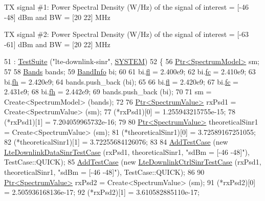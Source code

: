 TX signal \#1\+: Power Spectral Density (W/\+Hz) of the signal of interest = \mbox{[}-\/46 -\/48\mbox{]} d\+Bm and BW = \mbox{[}20 22\mbox{]} M\+Hz

TX signal \#2\+: Power Spectral Density (W/\+Hz) of the signal of interest = \mbox{[}-\/63 -\/61\mbox{]} d\+Bm and BW = \mbox{[}20 22\mbox{]} M\+Hz
\begin{DoxyCode}
51   : \hyperlink{classns3_1_1TestSuite_a904b0c40583b744d30908aeb94636d1a}{TestSuite} (\textcolor{stringliteral}{"lte-downlink-sinr"}, \hyperlink{classns3_1_1TestSuite_a1ebfcab34ec8161e085e8e3a1855eae0a90c5529a26ab3a5ffcc6e57040dbd82e}{SYSTEM})
52 \{
56   \hyperlink{classns3_1_1Ptr}{Ptr<SpectrumModel>} sm;
57 
58   \hyperlink{namespacens3_a46ac9188e5cf43bd5292f7b67451246e}{Bands} bands;
59   \hyperlink{structns3_1_1BandInfo}{BandInfo} bi;
60 
61   bi.\hyperlink{structns3_1_1BandInfo_a5e9018ae65c7625cc6d5c3c0067a9104}{fl} = 2.400e9;
62   bi.\hyperlink{structns3_1_1BandInfo_a02fad8a855735ff477f736bb8cb7bc25}{fc} = 2.410e9;
63   bi.\hyperlink{structns3_1_1BandInfo_a78e8fadd8cafcc28d74bda6010e3d6f4}{fh} = 2.420e9;
64   bands.push\_back (bi);
65 
66   bi.\hyperlink{structns3_1_1BandInfo_a5e9018ae65c7625cc6d5c3c0067a9104}{fl} = 2.420e9;
67   bi.\hyperlink{structns3_1_1BandInfo_a02fad8a855735ff477f736bb8cb7bc25}{fc} = 2.431e9;
68   bi.\hyperlink{structns3_1_1BandInfo_a78e8fadd8cafcc28d74bda6010e3d6f4}{fh} = 2.442e9;
69   bands.push\_back (bi);
70 
71   sm = Create<SpectrumModel> (bands);
72 
76   \hyperlink{classns3_1_1Ptr}{Ptr<SpectrumValue>} rxPsd1 = Create<SpectrumValue> (sm);
77   (*rxPsd1)[0] = 1.255943215755e-15;
78   (*rxPsd1)[1] = 7.204059965732e-16;
79 
80   \hyperlink{classns3_1_1Ptr}{Ptr<SpectrumValue>} theoreticalSinr1 = Create<SpectrumValue> (sm);
81   (*theoreticalSinr1)[0] = 3.72589167251055;
82   (*theoreticalSinr1)[1] = 3.72255684126076;
83 
84   \hyperlink{classns3_1_1TestCase_a3718088e3eefd5d6454569d2e0ddd835}{AddTestCase} (\textcolor{keyword}{new} \hyperlink{classLteDownlinkDataSinrTestCase}{LteDownlinkDataSinrTestCase} (rxPsd1, 
      theoreticalSinr1, \textcolor{stringliteral}{"sdBm = [-46 -48]"}), TestCase::QUICK);
85   \hyperlink{classns3_1_1TestCase_a3718088e3eefd5d6454569d2e0ddd835}{AddTestCase} (\textcolor{keyword}{new} \hyperlink{classLteDownlinkCtrlSinrTestCase}{LteDownlinkCtrlSinrTestCase} (rxPsd1, 
      theoreticalSinr1, \textcolor{stringliteral}{"sdBm = [-46 -48]"}), TestCase::QUICK);
86 
90   \hyperlink{classns3_1_1Ptr}{Ptr<SpectrumValue>} rxPsd2 = Create<SpectrumValue> (sm);
91   (*rxPsd2)[0] = 2.505936168136e-17;
92   (*rxPsd2)[1] = 3.610582885110e-17;

\end{DoxyCode}
